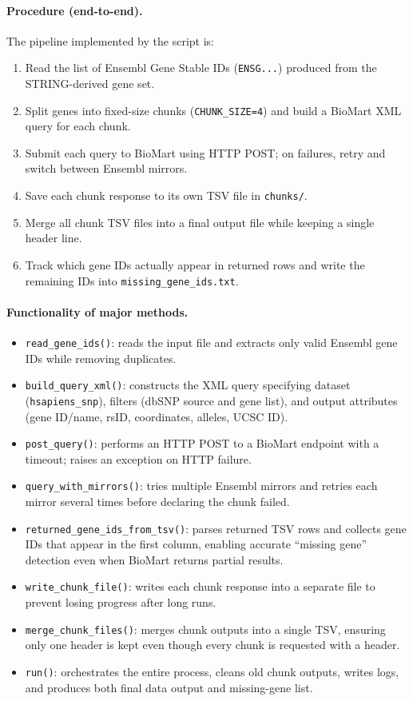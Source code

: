 \documentclass[11pt]{article}
\begin{document}
	\paragraph{Procedure (end-to-end).}
	The pipeline implemented by the script is:
	\begin{enumerate}
		\item Read the list of Ensembl Gene Stable IDs (\texttt{ENSG...}) produced from the STRING-derived gene set.
		\item Split genes into fixed-size chunks (\texttt{CHUNK\_SIZE=4}) and build a BioMart XML query for each chunk.
		\item Submit each query to BioMart using HTTP POST; on failures, retry and switch between Ensembl mirrors.
		\item Save each chunk response to its own TSV file in \texttt{chunks/}.
		\item Merge all chunk TSV files into a final output file while keeping a single header line.
		\item Track which gene IDs actually appear in returned rows and write the remaining IDs into \texttt{missing\_gene\_ids.txt}.
	\end{enumerate}
	
	\paragraph{Functionality of major methods.}
	\begin{itemize}
		\item \texttt{read\_gene\_ids()}: reads the input file and extracts only valid Ensembl gene IDs while removing duplicates.
		\item \texttt{build\_query\_xml()}: constructs the XML query specifying dataset (\texttt{hsapiens\_snp}), filters (dbSNP source and gene list), and output attributes (gene ID/name, rsID, coordinates, alleles, UCSC ID).
		\item \texttt{post\_query()}: performs an HTTP POST to a BioMart endpoint with a timeout; raises an exception on HTTP failure.
		\item \texttt{query\_with\_mirrors()}: tries multiple Ensembl mirrors and retries each mirror several times before declaring the chunk failed.
		\item \texttt{returned\_gene\_ids\_from\_tsv()}: parses returned TSV rows and collects gene IDs that appear in the first column, enabling accurate ``missing gene'' detection even when BioMart returns partial results.
		\item \texttt{write\_chunk\_file()}: writes each chunk response into a separate file to prevent losing progress after long runs.
		\item \texttt{merge\_chunk\_files()}: merges chunk outputs into a single TSV, ensuring only one header is kept even though every chunk is requested with a header.
		\item \texttt{run()}: orchestrates the entire process, cleans old chunk outputs, writes logs, and produces both final data output and missing-gene list.
	\end{itemize}
	
\end{document}
